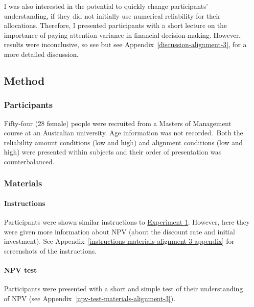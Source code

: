 \documentclass[a4paper, nobind, dvipsnames]{templates/ociamthesis}
\theoremstyle{definition}
\theoremstyle{definition}
\theoremstyle{definition}
\theoremstyle{definition}
\theoremstyle{remark}
\begin{document}
I was also interested in the potential to quickly change participants'
understanding, if they did not initially use numerical reliability for their
allocations. Therefore, I presented participants with a short lecture on the
importance of paying attention variance in financial decision-making. However,
results were inconclusive, so see but see
Appendix~\ref{discussion-alignment-3}, for a more detailed discussion.

\hypertarget{method-3}{%
\subsection{Method}\label{method-3}}

\hypertarget{participants-3}{%
\subsubsection{Participants}\label{participants-3}}

Fifty-four (28 female) people were recruited from a Masters of Management course at an Australian university. Age information was not recorded.~Both the reliability amount conditions (low and
high) and alignment conditions (low and high) were presented within subjects and
their order of presentation was counterbalanced.

\hypertarget{materials-2}{%
\subsubsection{Materials}\label{materials-2}}

\hypertarget{instructions-1}{%
\paragraph{Instructions}\label{instructions-1}}

Participants were shown similar instructions to \protect\hyperlink{instructions-materials-alignment-2}{Experiment
1}. However, here they were given more
information about NPV (about the discount rate and initial investment). See
Appendix~\ref{instructions-materials-alignment-3-appendix} for screenshots of
the instructions.

\hypertarget{npv-test}{%
\paragraph{NPV test}\label{npv-test}}

Participants were presented with a short and simple test of their understanding
of NPV (see Appendix~\ref{npv-test-materials-alignment-3}).
\end{document}
